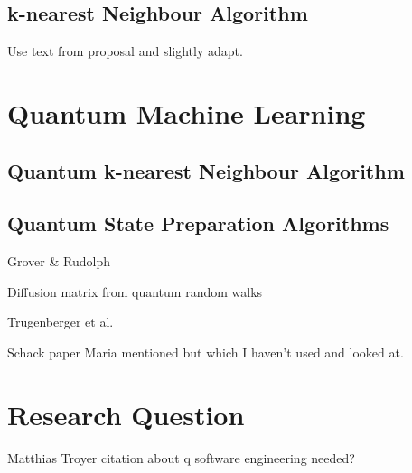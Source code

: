 \subsection{k-nearest Neighbour Algorithm}
\label{subsubsec:knearestneighbour}

Use text from proposal and slightly adapt.

\section{Quantum Machine Learning}
\label{subsec:quantummachinelearning}

\subsection{Quantum k-nearest Neighbour Algorithm}
\label{subsubsec:quantumknearestneighbour}

\subsection{Quantum State Preparation Algorithms}
\label{subsubsec:quantumstatepreparation}

Grover \& Rudolph

Diffusion matrix from quantum random walks

Trugenberger et al.

Schack paper Maria mentioned but which I haven't used and looked at.

\section{Research Question}
\label{subsec:researchquestion}

Matthias Troyer citation about q software engineering needed?